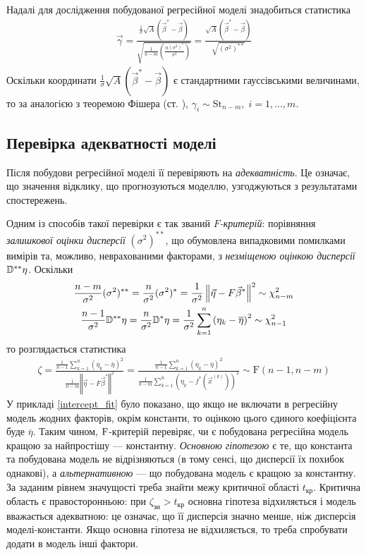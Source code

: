 Надалі для дослідження побудованої регресійної моделі знадобиться статистика
\begin{gather*}
    \vec{\gamma} = \frac{
        \frac{1}{\sigma} \sqrt{A}(\vec{\beta}^* - \vec{\beta})
    }{
        \sqrt{\frac{1}{n-m} \left(\frac{n (\sigma^2)^*}{\sigma^2}\right)}
    } = \frac{\sqrt{A}(\vec{\beta}^* - \vec{\beta})}{\sqrt{(\sigma^2)^{**}}}
\end{gather*}
Оскільки координати $\frac{1}{\sigma} \sqrt{A}(\vec{\beta}^* - \vec{\beta})$ є стандартними гауссівськими величинами,
то за аналогією з теоремою Фішера (ст. \pageref{Fisher_th}), $\gamma_i \sim \mathrm{St}_{n-m}, \; i = 1,..., m$.

\subsection{Перевірка адекватності моделі}
Після побудови регресійної моделі її перевіряють на \emph{адекватність}.
Це означає, що значення відклику, що прогнозуються моделлю, узгоджуються з результатами спостережень.

Одним із способів такої перевірки є так званий \emph{$F$-критерій}: порівняння \emph{залишкової оцінки дисперсії} $(\sigma^2)^{**}$, що обумовлена
випадковими помилками вимірів та, можливо, неврахованими факторами, з 
\emph{незміщеною оцінкою дисперсії} $\mathbb{D}^{**}\eta$. Оскільки
\begin{gather*}
    \frac{n-m}{\sigma^2} (\sigma^2)^{**}= 
    \frac{n}{\sigma^2}(\sigma^2)^* = \frac{1}{\sigma^2} \left\Vert \vec{\eta} - F \vec{\beta}^*\right\Vert^2 \sim \chi^2_{n-m} \\
    \frac{n-1}{\sigma^2} \mathbb{D}^{**}\eta = \frac{n}{\sigma^2} \mathbb{D}^* \eta = \frac{1}{\sigma^2} \sum\limits_{k=1}^n \left(\eta_k - \overline{\eta}\right)^2 \sim \chi^2_{n-1}
\end{gather*}
то розглядається статистика
\begin{gather}\label{f_test}
    \zeta = \frac{
        \frac{1}{n-1} \sum\limits_{k=1}^n \left(\eta_k - \overline{\eta}\right)^2
    }{
        \frac{1}{n-m} \left\Vert \vec{\eta} - F \vec{\beta}^*\right\Vert^2
    } = 
    \frac{
        \frac{1}{n-1} \sum\limits_{k=1}^n \left(\eta_k - \overline{\eta}\right)^2
    }{
        \frac{1}{n-m} \sum\limits_{k=1}^n \left(\eta_k - f^*\left(\vec{x}^{(k)}\right)\right)^2
    } \sim \mathrm{F}(n-1, n-m)
\end{gather}
У прикладі \ref{intercept_fit} було показано, що якщо не включати
в регресійну модель жодних факторів, окрім константи, то оцінкою цього єдиного коефіцієнта буде $\overline{\eta}$.
Таким чином, $\rm F$-критерій перевіряє, чи є побудована регресійна модель кращою за найпростішу --- константну.
\emph{Основною гіпотезою} є те, що константа та побудована модель не відрізняються (в тому сенсі, що дисперсії їх похибок однакові),
а \emph{альтернативною} --- що побудована модель є кращою за константну.
За заданим рівнем значущості треба знайти межу критичної області
$t_\text{кр}$. Критична область є правосторонньою: при $\zeta_\text{зн} > t_\text{кр}$ основна гіпотеза відхиляється і
модель вважається адекватною: це означає, що її дисперсія значно менше, ніж дисперсія моделі-константи.
Якщо основна гіпотеза не відхиляється, то треба спробувати додати в модель інші фактори.

